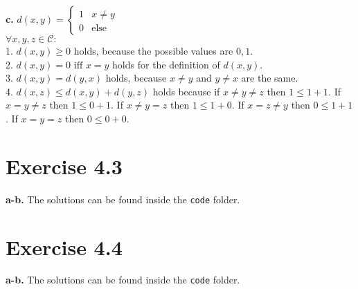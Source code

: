 \documentclass[12pt]{article}
\begin{document}
	\textbf{c.} $d(x,y) = \begin{cases} 1 & x \neq y\\ 0 & \mbox{else} \end{cases}$\\
	$\forall x, y, z \in \mathcal{C}:$\\
	1. $d(x,y) \geq 0$ holds, because the possible values are $0,1$.\\
	2. $d(x, y) = 0 \text{ iff } x = y$ holds for the definition of $d(x,y)$.\\
	3. $d(x, y) = d(y,x)$ holds, because $x \neq y$ and $y \neq x$ are the same.\\
	4. $d(x, z) \leq d(x, y) + d(y, z)$ holds because if $ x \neq y \neq z$ then $1 \leq 1 + 1$. If $x = y \neq z$ then $1 \leq 0 + 1$. If $x \neq y = z$ then $1 \leq 1 + 0$. If $x = z \neq y$ then $0 \leq 1 + 1$. If $x = y = z$ then $0 \leq 0 + 0$.
	
	\section*{Exercise 4.3}
	\textbf{a-b.} The solutions can be found inside the \texttt{code} folder.
	\section*{Exercise 4.4}
	\textbf{a-b.} The solutions can be found inside the \texttt{code} folder.
\end{document}
